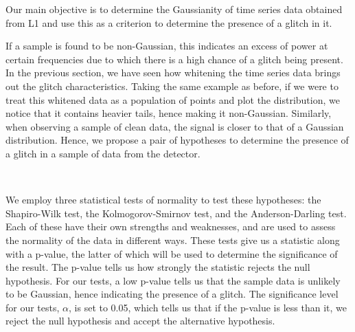 \documentclass[12pt]{article}
\begin{document}
Our main objective is to determine the Gaussianity of time series data obtained from L1 and use this as a criterion to determine the presence of a glitch in it. 

\medskip
\noindent If a sample is found to be non-Gaussian, this indicates an excess of power at certain frequencies due to which there is a high chance of a glitch being present. In the previous section, we have seen how whitening the time series data brings out the glitch characteristics. Taking the same example as before, if we were to treat this whitened data as a population of points and plot the distribution, we notice that it contains heavier tails, hence making it non-Gaussian. Similarly, when observing a sample of clean data, the signal is closer to that of a Gaussian distribution. Hence, we propose a pair of hypotheses to determine the presence of a glitch in a sample of data from the detector.


\medskip
\noindent{}
\\
\noindent{}

\medskip
\noindent We employ three statistical tests of normality to test these hypotheses: the Shapiro-Wilk test, the Kolmogorov-Smirnov test, and the Anderson-Darling test. Each of these have their own strengths and weaknesses, and are used to assess the normality of the data in different ways. These tests give us a statistic along with a p-value, the latter of which will be used to determine the significance of the result. The p-value tells us how strongly the statistic rejects the null hypothesis. For our tests, a low p-value tells us that the sample data is unlikely to be Gaussian, hence indicating the presence of a glitch. The significance level for our tests, $\alpha$, is set to 0.05, which tells us that if the p-value is less than it, we reject the null hypothesis and accept the alternative hypothesis.
\end{document}
